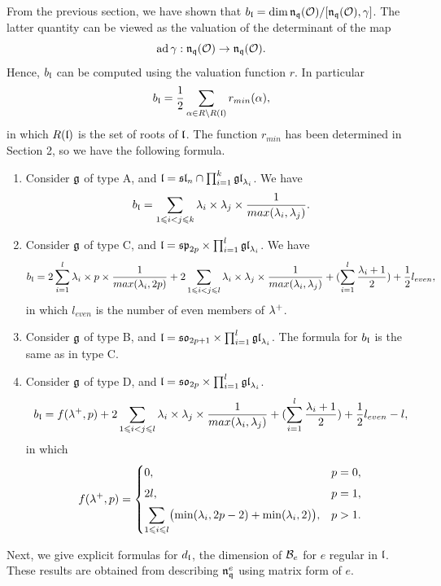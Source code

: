 \documentclass[11pt]{article}
\numberwithin{equation}{section}
\begin{document}
\begin{appendix}
From the previous section, we have shown that $b_{\mathfrak{l}}= \dim \mathfrak{n}_{\mathfrak{q}}(\mathcal{O})/[\mathfrak{n}_{\mathfrak{q}}(\mathcal{O}),\gamma]$. The latter quantity can be viewed as the valuation of the determinant of the map
$$\operatorname{ad} \gamma: \mathfrak{n}_{\mathfrak{q}}(\mathcal{O})\to \mathfrak{n}_{\mathfrak{q}}(\mathcal{O}).$$
Hence, $b_{\mathfrak{l}}$ can be computed using the valuation function $r$. In particular 
$$b_{\mathfrak{l}}= \frac{1}{2}\sum_{\alpha\in R\setminus R(\mathfrak{l})} r_{min}(\alpha),$$
in which $R(\mathfrak{l})$ is the set of roots of $\mathfrak{l}$. The function $r_{min}$ has been determined in Section 2, so we have the following formula.
\begin{enumerate}
    \item Consider $\mathfrak{g}$ of type A, and $\mathfrak{l}= \mathfrak{sl}_n\cap \prod_{i=1}^k \mathfrak{gl}_{\lambda_i}$. We have 
    $$b_{\mathfrak{l}}= \sum_{1\leqslant i< j\leqslant k} \lambda_i\times \lambda_j\times \frac{1}{max(\lambda_i,\lambda_j)}.$$
    \item Consider $\mathfrak{g}$ of type C, and $\mathfrak{l}= \mathfrak{sp}_{2p}\times \prod_{i=1}^l\mathfrak{gl}_{\lambda_i}$. We have 
    $$b_{\mathfrak{l}}= 2\sum_{i=1}^l \lambda_i\times p \times \frac{1}{max(\lambda_i,2p)}+ 2\sum_{1\leqslant i< j\leqslant l} \lambda_i\times \lambda_j\times \frac{1}{max(\lambda_i,\lambda_j)}+ (\sum_{i=1}^{l} \frac{\lambda_i+1}{2})+ \frac{1}{2}l_{even},$$
    in which $l_{even}$ is the number of even members of $\lambda^+$.
    \item Consider $\mathfrak{g}$ of type B, and $\mathfrak{l}= \mathfrak{so}_{2p+1}\times \prod_{i=1}^l\mathfrak{gl}_{\lambda_i}$. The formula for $b_{\mathfrak{l}}$ is the same as in type C.
    \item Consider $\mathfrak{g}$ of type D, and $\mathfrak{l}= \mathfrak{so}_{2p}\times \prod_{i=1}^l\mathfrak{gl}_{\lambda_i}$. 
    $$b_{\mathfrak{l}}=f(\lambda^+, p) +2\sum_{1\leqslant i< j\leqslant l} \lambda_i\times \lambda_j\times \frac{1}{max(\lambda_i,\lambda_j)}+ (\sum_{i=1}^{l} \frac{\lambda_i+1}{2})+ \frac{1}{2}l_{even}-l,$$
    in which 
    \[
f(\lambda^+,p)
=
\begin{cases}
0, & p=0,\\[4pt]
2l, & p=1,\\[4pt]
\displaystyle \sum_{1\leqslant i\leqslant l}\bigl(\min(\lambda_i,2p-2)+\min(\lambda_i,2)\bigr), & p>1.
\end{cases}
\]
\end{enumerate}
Next, we give explicit formulas for $d_{\mathfrak{l}}$, the dimension of $\mathcal{B}_e$ for $e$ regular in $\mathfrak{l}$. These results are obtained from describing $\mathfrak{n}_{\mathfrak{q}}^{e}$ using matrix form of $e$.


\end{appendix}
\end{document}
